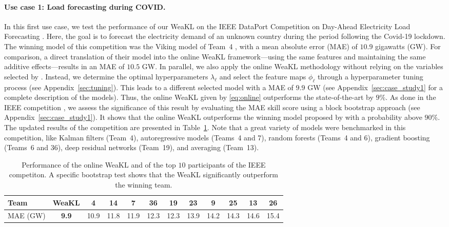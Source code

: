 \paragraph{Use case 1: Load forecasting during COVID.} In this first use case, we test the performance of our WeaKL on the IEEE DataPort Competition on Day-Ahead Electricity
Load Forecasting \citep{Farrokhabadi2022day}.
Here, the goal is to forecast the electricity demand of an unknown country during the period following the Covid-19 lockdown.
The winning model of this competition was the Viking model of Team~4 \citep{vilmarest2022state}, with a mean absolute error (MAE) of $10.9$ gigawatts (GW). For comparison, a direct translation of their model into the online WeaKL framework---using the same features and maintaining the same additive effects---results in an MAE of $10.5$ GW. In parallel, we also apply the online WeaKL methodology without relying on the variables selected by \citet{vilmarest2022state}. Instead, we determine the optimal hyperparameters $\lambda_\ell$ and select the feature maps $\phi_\ell$ through a hyperparameter tuning process (see Appendix~\ref{sec:tuning}). This leads to a different selected model with a MAE of $9.9$ GW (see Appendix~\ref{sec:case_study1} for a complete description of the models). 
Thus, the online WeaKL given by \eqref{eq:online} outperforms the state-of-the-art by $9\%$. 
As done in the IEEE competition \citep{Farrokhabadi2022day}, we assess the significance of this result by evaluating the MAE skill score using a block bootstrap approach (see Appendix~\ref{sec:case_study1}). 
It shows that the online WeaKL outperforms the winning model proposed by \citet{vilmarest2022state} with a probability above $90\%$.
The updated results of the competition are presented in Table~\ref{tab:ieee}. 
Note that a great variety of models were benchmarked in this competition, like Kalman filters (Team~4), autoregressive models (Teams~4 and 7), random forests (Teams~4 and 6), gradient boosting (Teams~6 and 36),  deep residual networks (Team~19), and averaging (Team~13).

\begin{table}[h]
\centering
\caption{Performance of the online WeaKL and of the top $10$ participants of the IEEE competiton. A specific bootstrap test shows that the WeaKL significantly outperform the winning team.}
\begin{tabular}{lccccccccccc}
\toprule
Team & WeaKL &  4 &   14 &   7 &   36 &   19 &   23 &   9 &   25 &   13 &   26 \\
\midrule
MAE (GW)  & \textbf{9.9} & 10.9 & 11.8 & 11.9 & 12.3 & 12.3 & 13.9 & 14.2 & 14.3 & 14.6 & 15.4\\
\bottomrule
\end{tabular}

\label{tab:ieee}
\end{table}

